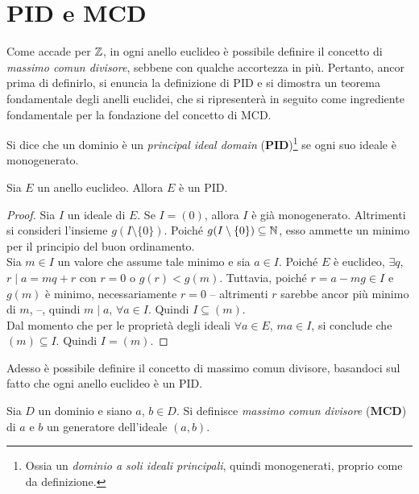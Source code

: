 \documentclass[11pt]{scrbook}
\begin{document}
\section{PID e MCD}

Come accade per $\mathbb Z$, in ogni anello euclideo è possibile definire il
concetto di \textit{massimo comun divisore}, sebbene con qualche accortezza
in più. Pertanto, ancor prima di definirlo, si enuncia la definizione di
PID e si dimostra un teorema fondamentale degli anelli euclidei, che
si ripresenterà in seguito come ingrediente fondamentale per la fondazione
del concetto di MCD.

\begin{definition}
    Si dice che un dominio è un \textit{principal ideal domain} (\textbf{PID})\footnote{Ossia un \textit{dominio
            a soli ideali principali}, quindi monogenerati, proprio come da definizione.} se ogni suo ideale è monogenerato.
\end{definition}

\begin{theorem}
    Sia $E$ un anello euclideo. Allora $E$ è un PID.
\end{theorem}

\begin{proof}
    Sia $I$ un ideale di $E$. Se $I = (0)$, allora $I$ è già monogenerato.
    Altrimenti si consideri l'insieme $g(I \setminus \{0\})$. Poiché
    $g(I \setminus \{0\}) \subseteq \mathbb N$,
    esso ammette un minimo per il principio del buon ordinamento. \\

    Sia $m \in I$ un valore che assume tale minimo e sia $a \in I$.
    Poiché $E$ è euclideo, $\exists q$, $r \mid a = mq + r$ con $r=0$ o
    $g(r)<g(m)$. Tuttavia, poiché $r = a-mg \in I$ e $g(m)$ è minimo, necessariamente $r=0$ -- altrimenti $r$ sarebbe
    ancor più minimo di $m$, \Lightning{} --,
    quindi $m \mid a$, $\forall a \in I$. Quindi $I \subseteq (m)$. \\

    Dal momento che per le proprietà degli ideali $\forall a \in E$, $ma \in I$,
    si conclude che $(m) \subseteq I$. Quindi $I = (m)$.
\end{proof}

Adesso è possibile definire il concetto di massimo comun divisore, basandoci
sul fatto che ogni anello euclideo è un PID.

\begin{definition}
    Sia $D$ un dominio e siano $a$, $b \in D$. Si definisce
    \textit{massimo comun divisore} (\textbf{MCD}) di $a$ e $b$ un
    generatore dell'ideale $(a,b)$.
\end{definition}
\end{document}

